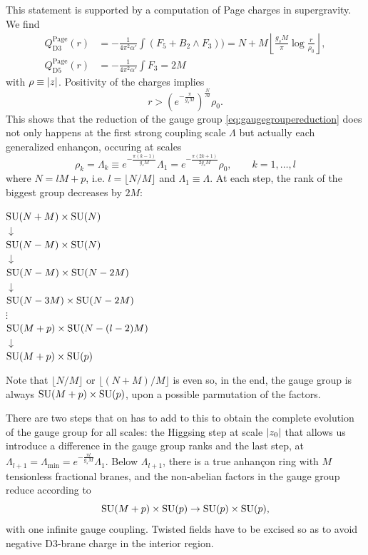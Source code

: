     This statement is supported by a computation of Page charges in supergravity. We find
    \begin{align}
        Q^{\text{Page}}_{\text{D3}}(r) &= -\frac{1}{4\pi^2\alpha'}\int (F_5+B_2\wedge F_3))=N+M\left\lfloor\frac{g_sM}{\pi}\log\frac{r}{\rho_0}\right\rfloor,\\
        Q^{\text{Page}}_{\text{D5}}(r) &= -\frac{1}{4\pi^2\alpha'}\int F_3=2M
    \end{align}
    with $\rho\equiv\abs{z}$. Positivity of the charges implies
    \begin{equation}
        r>(e^{-\frac{\pi}{g_sM}})^{\frac{N}{M}}\rho_0.
    \end{equation}
    This shows that the reduction of the gauge group \eqref{eq:gaugegroupereduction} does not only happens at the first strong coupling scale $\Lambda$ but actually each generalized enhançon, occuring at scales
    \begin{equation}
        \rho_k=\Lambda_k\equiv e^{-\frac{\pi(k-1)}{g_sM}}\Lambda_1 = e^{-\frac{\pi(2k+1)}{2g_sM}}\rho_0, \qquad k=1,\dots,l
    \end{equation}
    where $N=lM+p$, i.e. $l=\lfloor N/M\rfloor$ and $\Lambda_1\equiv\Lambda$. At each step, the rank of the biggest group decreases by $2M$:
    \begin{center}
        $\text{SU}(N+M)\times\text{SU}(N)$\\
        $\downarrow$\\
        $\text{SU}(N-M)\times\text{SU}(N)$\\
        $\downarrow$\\
        $\text{SU}(N-M)\times\text{SU}(N-2M)$\\
        $\downarrow$\\
        $\text{SU}(N-3M)\times\text{SU}(N-2M)$\\
        $\vdots$\\
        $\text{SU}(M+p)\times\text{SU}(N-(l-2)M)$\\
        $\downarrow$\\
        $\text{SU}(M+p)\times\text{SU}(p)$\\
    \end{center}
    Note that $\lfloor N/M\rfloor$ or $\lfloor(N+M)/M\rfloor$ is even so, in the end, the gauge group is always $\text{SU}(M+p)\times\text{SU}(p)$, upon a possible parmutation of the factors.

    There are two steps that on has to add to this to obtain the complete evolution of the gauge group for all scales: the Higgsing step at scale $\abs{z_0}$ that allows us introduce a difference in the gauge group ranks and the last step, at $\Lambda_{l+1}=\Lambda_{\text{min}}=e^{-\frac{\pi l}{g_s M}}\Lambda_1$. Below $\Lambda_{l+1}$, there is a true anhançon ring with $M$ tensionless fractional branes, and the non-abelian factors in the gauge group reduce according to
    \begin{equation}
        \text{SU}(M+p)\times\text{SU}(p)\to\text{SU}(p)\times\text{SU}(p),
    \end{equation}
    with one infinite gauge coupling. Twisted fields have to be excised so as to avoid negative D$3$-brane charge in the interior region.

